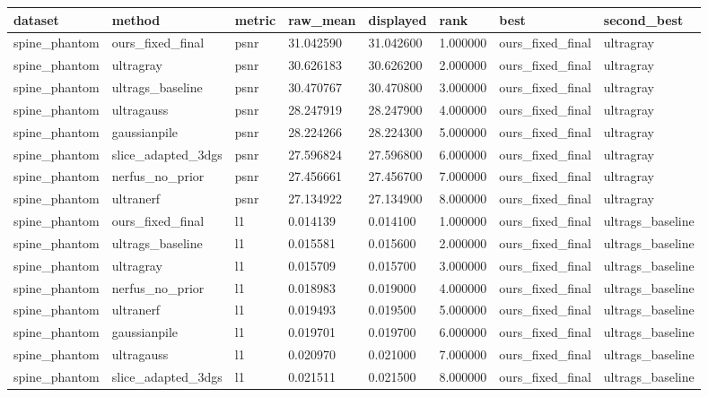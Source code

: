 \begin{tabular}{llllllll}
dataset & method & metric & raw\_mean & displayed & rank & best & second\_best \\
\hline
spine\_phantom & ours\_fixed\_final & psnr & 31.042590 & 31.042600 & 1.000000 & ours\_fixed\_final & ultragray \\
spine\_phantom & ultragray & psnr & 30.626183 & 30.626200 & 2.000000 & ours\_fixed\_final & ultragray \\
spine\_phantom & ultrags\_baseline & psnr & 30.470767 & 30.470800 & 3.000000 & ours\_fixed\_final & ultragray \\
spine\_phantom & ultragauss & psnr & 28.247919 & 28.247900 & 4.000000 & ours\_fixed\_final & ultragray \\
spine\_phantom & gaussianpile & psnr & 28.224266 & 28.224300 & 5.000000 & ours\_fixed\_final & ultragray \\
spine\_phantom & slice\_adapted\_3dgs & psnr & 27.596824 & 27.596800 & 6.000000 & ours\_fixed\_final & ultragray \\
spine\_phantom & nerfus\_no\_prior & psnr & 27.456661 & 27.456700 & 7.000000 & ours\_fixed\_final & ultragray \\
spine\_phantom & ultranerf & psnr & 27.134922 & 27.134900 & 8.000000 & ours\_fixed\_final & ultragray \\
spine\_phantom & ours\_fixed\_final & l1 & 0.014139 & 0.014100 & 1.000000 & ours\_fixed\_final & ultrags\_baseline \\
spine\_phantom & ultrags\_baseline & l1 & 0.015581 & 0.015600 & 2.000000 & ours\_fixed\_final & ultrags\_baseline \\
spine\_phantom & ultragray & l1 & 0.015709 & 0.015700 & 3.000000 & ours\_fixed\_final & ultrags\_baseline \\
spine\_phantom & nerfus\_no\_prior & l1 & 0.018983 & 0.019000 & 4.000000 & ours\_fixed\_final & ultrags\_baseline \\
spine\_phantom & ultranerf & l1 & 0.019493 & 0.019500 & 5.000000 & ours\_fixed\_final & ultrags\_baseline \\
spine\_phantom & gaussianpile & l1 & 0.019701 & 0.019700 & 6.000000 & ours\_fixed\_final & ultrags\_baseline \\
spine\_phantom & ultragauss & l1 & 0.020970 & 0.021000 & 7.000000 & ours\_fixed\_final & ultrags\_baseline \\
spine\_phantom & slice\_adapted\_3dgs & l1 & 0.021511 & 0.021500 & 8.000000 & ours\_fixed\_final & ultrags\_baseline \\

\end{tabular}
